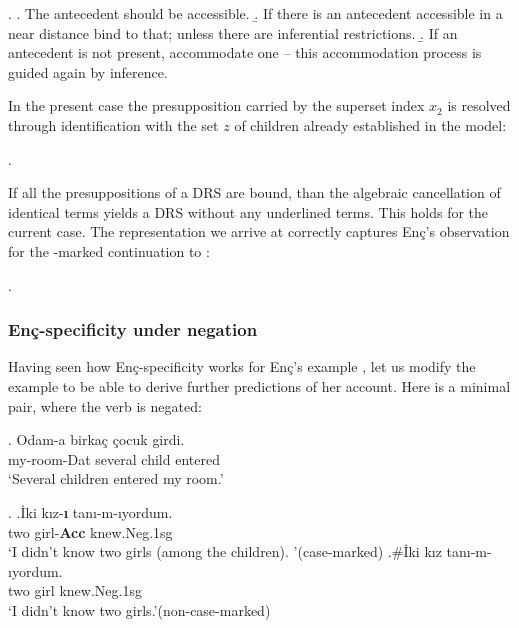 \documentclass[11pt,a4paper]{article}
\newcommand{\encspec}{Enç-specific}
\begin{document}
\ex.
\a. The antecedent should be accessible.
\b. If there is an antecedent accessible in a near distance bind to that; unless there are inferential restrictions.
\b. If an antecedent is not present, accommodate one -- this accommodation process is guided again by inference.

In the present case the presupposition carried by the superset index $x_2$ is resolved through identification with the set $z$ of children already established in the model:

\ex.


If all the presuppositions of a DRS are bound, than the algebraic cancellation of identical terms yields a DRS without any underlined terms. This holds for the current case. The representation we arrive at correctly captures Enç's observation for the \acc-marked continuation to :

\ex.

\subsubsection{\encspec ity under negation}


Having seen how \encspec ity works for Enç's example , let us modify the example to be able to derive further predictions of her account. Here is a minimal pair, where the verb  is negated:

\exg.\label{Exenc16neg}%
{Odam-a}  {birka\c{c}} {\c{c}ocuk} {girdi.}\\
{my-room-Dat} {several}  {child}  {entered}\\
`Several children entered my room.'

\ex.\label{Exenc17neg}
\ag.\label{Exencnegacc}{\.Iki}  {k\i{}z-\textbf{\i}} {tan\i{}-m-ıyordum}.\\
{two}  {girl-{\bf Acc}}  {knew.Neg.1sg}\\
`I didn't know two girls (among the children). '\hfill (case-marked)
\bg.\label{Exencnegzero}\#{\.Iki}  {k\i{}z}  {tan\i{}-m-ıyordum.} \\
{two}  {girl}  {knew.Neg.1sg}\\
`I didn't know two girls.'\hfill (non-case-marked)
\end{document}

